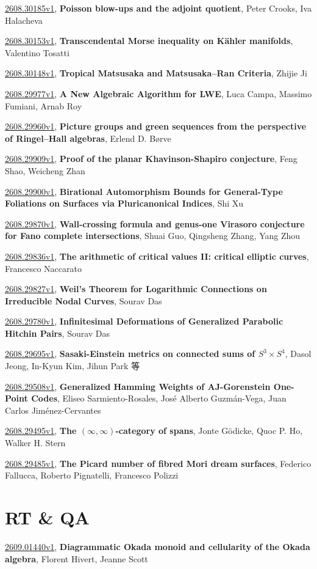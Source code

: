 \documentclass[9pt, a4paper]{article}
\theoremstyle{plain}
\theoremstyle{definition}
\theoremstyle{remark}
\newcommand{\arxiv}[3]{\href{https://arxiv.org/abs/#1}{#1}, \textbf{\textcolor{arxivblue}{#2}}, #3}
\begin{document}
\arxiv{2608.30185v1}{Poisson blow-ups and the adjoint quotient}{Peter Crooks, Iva Halacheva}

\arxiv{2608.30153v1}{Transcendental Morse inequality on Kähler manifolds}{Valentino Tosatti}

\arxiv{2608.30148v1}{Tropical Matsusaka and Matsusaka--Ran Criteria}{Zhijie Ji}

\arxiv{2608.29977v1}{A New Algebraic Algorithm for LWE}{Luca Campa, Massimo Fumiani, Arnab Roy}

\arxiv{2608.29960v1}{Picture groups and green sequences from the perspective of Ringel--Hall algebras}{Erlend D. Børve}

\arxiv{2608.29909v1}{Proof of the planar Khavinson-Shapiro conjecture}{Feng Shao, Weicheng Zhan}

\arxiv{2608.29900v1}{Birational Automorphism Bounds for General-Type Foliations on Surfaces via Pluricanonical Indices}{Shi Xu}

\arxiv{2608.29870v1}{Wall-crossing formula and genus-one Virasoro conjecture for Fano complete intersections}{Shuai Guo, Qingsheng Zhang, Yang Zhou}

\arxiv{2608.29836v1}{The arithmetic of critical values II: critical elliptic curves}{Francesco Naccarato}

\arxiv{2608.29827v1}{Weil's Theorem for Logarithmic Connections on Irreducible Nodal Curves}{Sourav Das}

\arxiv{2608.29780v1}{Infinitesimal Deformations of Generalized Parabolic Hitchin Pairs}{Sourav Das}

\arxiv{2608.29695v1}{Sasaki-Einstein metrics on connected sums of $S^3\times S^4$}{Dasol Jeong, In-Kyun Kim, Jihun Park 等}

\arxiv{2608.29508v1}{Generalized Hamming Weights of AJ-Gorenstein One-Point Codes}{Eliseo Sarmiento-Rosales, José Alberto Guzmán-Vega, Juan Carlos Jiménez-Cervantes}

\arxiv{2608.29495v1}{The $(\infty,\infty)$-category of spans}{Jonte Gödicke, Quoc P. Ho, Walker H. Stern}

\arxiv{2608.29485v1}{The Picard number of fibred Mori dream surfaces}{Federico Fallucca, Roberto Pignatelli, Francesco Polizzi}


\section{RT \& QA}
\arxiv{2609.01440v1}{Diagrammatic Okada monoid and cellularity of the Okada algebra}{Florent Hivert, Jeanne Scott}
\end{document}
